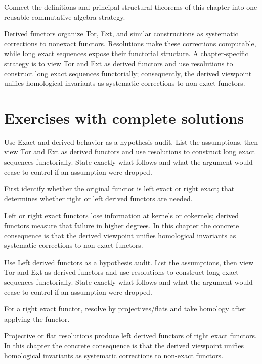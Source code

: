 \begin{problem}\label{prob:v28-problem-12}
Connect the definitions and principal structural theorems of this chapter into one reusable commutative-algebra strategy.
\end{problem}
\begin{solution}
Derived functors organize Tor, Ext, and similar constructions as systematic corrections to nonexact functors. Resolutions make these corrections computable, while long exact sequences expose their functorial structure. A chapter-specific strategy is to view Tor and Ext as derived functors and use resolutions to construct long exact sequences functorially; consequently, the derived viewpoint unifies homological invariants as systematic corrections to non-exact functors.
\end{solution}

\section{Exercises with complete solutions}

\begin{exercise}\label{exr:v28-01}
Use Exact and derived behavior as a hypothesis audit. List the assumptions, then view Tor and Ext as derived functors and use resolutions to construct long exact sequences functorially. State exactly what follows and what the argument would cease to control if an assumption were dropped.
\end{exercise}
\begin{hint}
First identify whether the original functor is left exact or right exact; that determines whether right or left derived functors are needed.
\end{hint}
\begin{solution}
Left or right exact functors lose information at kernels or cokernels; derived functors measure that failure in higher degrees. In this chapter the concrete consequence is that the derived viewpoint unifies homological invariants as systematic corrections to non-exact functors.
\end{solution}

\begin{exercise}\label{exr:v28-02}
Use Left derived functors as a hypothesis audit. List the assumptions, then view Tor and Ext as derived functors and use resolutions to construct long exact sequences functorially. State exactly what follows and what the argument would cease to control if an assumption were dropped.
\end{exercise}
\begin{hint}
For a right exact functor, resolve by projectives/flats and take homology after applying the functor.
\end{hint}
\begin{solution}
Projective or flat resolutions produce left derived functors of right exact functors. In this chapter the concrete consequence is that the derived viewpoint unifies homological invariants as systematic corrections to non-exact functors.
\end{solution}

